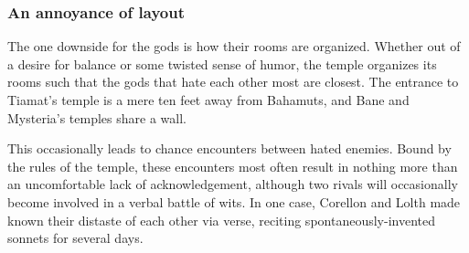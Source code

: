 \subsubsection{An annoyance of layout}
The one downside for the gods is how their rooms are organized.
Whether out of a desire for balance or some twisted sense of humor, the temple organizes its rooms such that the gods that hate each other most are closest.
The entrance to Tiamat's temple is a mere ten feet away from Bahamuts, and Bane and Mysteria's temples share a wall.

This occasionally leads to chance encounters between hated enemies.
Bound by the rules of the temple, these encounters most often result in nothing more than an uncomfortable lack of acknowledgement, although two rivals will occasionally become involved in a verbal battle of wits.
In one case, Corellon and Lolth made known their distaste of each other via verse, reciting spontaneously-invented sonnets for several days.


